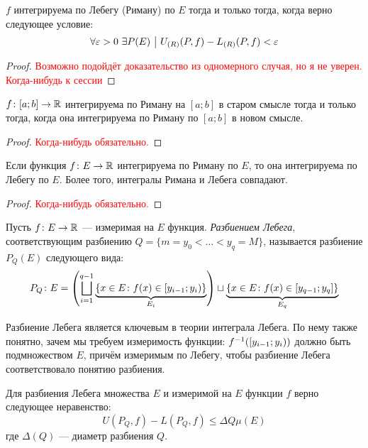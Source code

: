 \begin{proposition} \label{commonEquivLebeg}
	$f$ интегрируема по Лебегу (Риману) по $E$ тогда и только тогда, когда верно следующее условие:
	\[
		\forall \varepsilon > 0\ \exists P(E) \ \big|\  U_{(R)}(P, f) - L_{(R)}(P, f) < \varepsilon
	\]
\end{proposition}

\begin{proof}
	\textcolor{red}{Возможно подойдёт доказательство из одномерного случая, но я не уверен. Когда-нибудь к сессии}
\end{proof}

\begin{proposition}
	$f \colon [a; b] \to \mathbb{R}$ интегрируема по Риману на $[a; b]$ в старом смысле тогда и только тогда, когда она интегрируема по Риману по $[a; b]$ в новом смысле.
\end{proposition}

\begin{proof}
	\textcolor{red}{Когда-нибудь обязательно.}
\end{proof}

\begin{proposition}
	Если функция $f \colon E \to \mathbb{R}$ интегрируема по Риману по $E$, то она интегрируема по Лебегу по $E$. Более того, интегралы Римана и Лебега совпадают.
\end{proposition}

\begin{proof}
	\textcolor{red}{Когда-нибудь обязательно.}
\end{proof}

\begin{definition}
	Пусть $f \colon E \to \mathbb{R}$ --- измеримая на $E$ функция. \textit{Разбиением Лебега}, соответствующим разбиению $Q = \{m = y_0 < \ldots < y_q = M\}$, называется разбиение $P_Q(E)$ следующего вида:
	\[
		P_Q \colon E = \left(\bigsqcup_{i = 1}^{q - 1} \underbrace{\{x \in E \colon f(x) \in \left[y_{i - 1}; y_i\right)\}}_{E_i}\right) \sqcup \underbrace{\{x \in E \colon f(x) \in [y_{q - 1}; y_q]\}}_{E_q}
	\]
\end{definition}

\begin{note}
	Разбиение Лебега является ключевым в теории интеграла Лебега. По нему также понятно, зачем мы требуем измеримость функции: $f^{-1}(\left[y_{i - 1}; y_i\right))$ должно быть подмножеством $E$, причём измеримым по Лебегу, чтобы разбиение Лебега соответствовало понятию разбиения.
\end{note}

\begin{proposition} \label{uminl-le-dqe}
	Для разбиения Лебега множества $E$ и измеримой на $E$ функции $f$ верно следующее неравенство:
	\[
		U(P_Q, f) - L(P_Q, f) \le \Delta Q \mu(E)
	\]
	где $\Delta(Q)$ --- диаметр разбиения $Q$.
\end{proposition}

